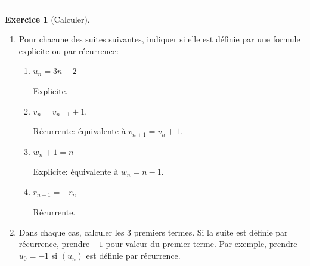 \documentclass{exam}
\theoremstyle{definition}
\newtheorem{exercice}{Exercice}
\begin{document}
\Large

\vspace{5mm}

\begin{center}
\end{center}

~\\



\medskip\hrule

\begin{exercice}[Calculer]
    \begin{enumerate}
    \item Pour chacune des suites suivantes, indiquer si elle est définie par une formule explicite ou par récurrence:
    \begin{enumerate}
        \item $u_n = 3n - 2$

        Explicite.
        \item $v_{n} = v_{n-1} + 1.$
        
        Récurrente: équivalente à $v_{n+1} = v_n + 1.$
        \item $w_{n} + 1 = n$

        Explicite: équivalente à $w_{n} = n-1.$
        \item $r_{n+1} = -r_n$
        
        Récurrente.
    \end{enumerate}
    
    \item Dans chaque cas, calculer les 3 premiers termes. Si la suite est définie par récurrence, prendre $-1$ pour valeur du premier terme. Par exemple, prendre $u_0 = -1$ si $(u_n)$ est définie par récurrence.
    \end{enumerate}
    \begin{center}
    \end{center}
\end{exercice}
\end{document}

